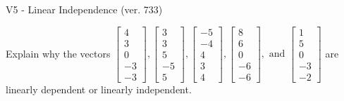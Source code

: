 \begin{exercise}
  \begin{exerciseTitle}V5 - Linear Independence (ver. 733)\end{exerciseTitle}
  \begin{exerciseStatement}
    Explain why the vectors \(\left[\begin{array}{r}
4 \\
3 \\
0 \\
-3 \\
-3
\end{array}\right] , \left[\begin{array}{r}
3 \\
3 \\
5 \\
-5 \\
5
\end{array}\right] , \left[\begin{array}{r}
-5 \\
-4 \\
4 \\
3 \\
4
\end{array}\right] , \left[\begin{array}{r}
8 \\
6 \\
0 \\
-6 \\
-6
\end{array}\right] , \text{ and } \left[\begin{array}{r}
1 \\
5 \\
0 \\
-3 \\
-2
\end{array}\right]\) are linearly dependent or linearly independent.	



\end{exerciseStatement}
\end{exercise}
